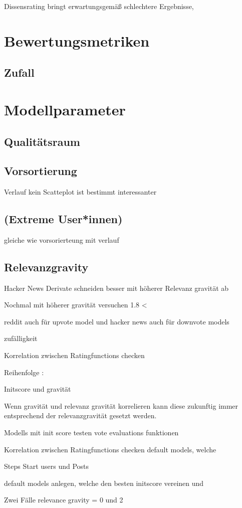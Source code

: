 Dissensrating bringt erwartungsgemäß schlechtere Ergebnisse, 


\section{Bewertungsmetriken}

\subsection{Zufall}


\section{Modellparameter}

\subsection{Qualitätsraum}

\subsection{Vorsortierung}

Verlauf kein Scatteplot ist bestimmt interessanter

\subsection{(Extreme User*innen)}

gleiche wie vorsorierteung mit verlauf


\subsection{Relevanzgravity}

Hacker News Derivate schneiden besser mit höherer Relevanz gravität ab

Nochmal mit höherer gravität versuchen 1.8 < 


reddit auch für upvote model und hacker news auch für downvote models

zufälligkeit


Korrelation zwischen Ratingfunctions checken


Reihenfolge :

Initscore und gravität

Wenn gravität und relevanz gravität korrelieren kann diese zukunftig immer entsprechend der relevanzgravität gesetzt werden.

Modells mit init score testen
vote evaluations funktionen

Korrelation zwischen Ratingfunctions checken
default models, welche 

Steps
Start users und Posts

default models anlegen, welche den besten initscore vereinen und 



Zwei Fälle relevance gravity = 0 und 2


